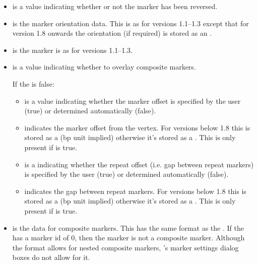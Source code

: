 \begin{numbered}
\begin{enumerate}
\begin{enumerate}
\begin{itemize}
    \item {} is a  value indicating whether
    or not the marker has been reversed.

    \item {} is the marker orientation data. This is as
    for versions 1.1--1.3 except that for version 1.8 onwards the
    orientation  (if required) is stored as an .

    \item {} is the marker  is as for
    versions 1.1--1.3.

    \item {} is a  value indicating whether
    to overlay composite markers.

    If the  is false:
      \begin{itemize}
      \item {} is a  value indicating
      whether the marker offset is specified by the user (true) or
      determined automatically (false).

      \item {} indicates the marker
      offset from the vertex. For versions below 1.8 this is stored as a
       (\gls*{bp} unit implied) otherwise it's stored as a . This is only
      present if  is true.

      \item {} is a  indicating whether the
      repeat offset (i.e. gap between repeat markers) is specified by
      the user (true) or determined automatically (false).

      \item {} indicates the
      gap between repeat markers. For versions below 1.8 this is stored as a
       (\gls*{bp} unit implied) otherwise it's stored as a
      . This is only
      present if  is true.
      \end{itemize}

    \item {} is the data for composite markers.
    This has the same format as the . If the
     has a marker id of 0, then the marker
    is not a composite marker. Although the format allows for nested
    composite markers, \FlowframTk's marker settings dialog boxes do not
    allow for it.
    \end{itemize}
  \end{enumerate}%


\end{enumerate}
\end{numbered}
